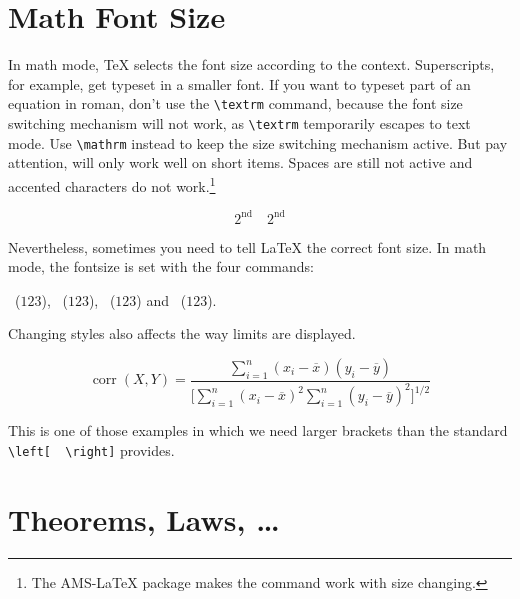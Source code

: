 \section{Math Font Size}

 In math mode, \TeX{} selects the font size
according to the context. Superscripts, for example, get typeset in a
smaller font. If you want to typeset part of an equation in roman,
don't use the \verb|\textrm| command, because the font size switching
mechanism will not work, as \verb|\textrm| temporarily escapes to text
mode. Use \verb|\mathrm| instead to keep the size switching mechanism
active. But pay attention,  will only work well on short
items. Spaces are still not active and accented characters do not
work.\footnote{The AMS-\LaTeX{} package makes the  command
  work with size changing.}

\begin{example}
\begin{equation}
2^{\textrm{nd}} \quad 
2^{\mathrm{nd}}
\end{equation}
\end{example}

Nevertheless, sometimes you need to tell \LaTeX{} the correct font
size. In math mode, the fontsize is set with the four commands:
\begin{flushleft}
~($\displaystyle 123$),
 ~($\textstyle 123$), 
~($\scriptstyle 123$) and
~($\scriptscriptstyle 123$).
\end{flushleft}

Changing styles also affects the way limits are displayed.

\begin{example}
\begin{displaymath}
\mathop{\mathrm{corr}}(X,Y)= 
 \frac{\displaystyle 
   \sum_{i=1}^n(x_i-\overline x)
   (y_i-\overline y)} 
  {\displaystyle\biggl[
 \sum_{i=1}^n(x_i-\overline x)^2
\sum_{i=1}^n(y_i-\overline y)^2
\biggr]^{1/2}}
\end{displaymath}    
\end{example}

\noindent This is one of those examples in which we need larger
brackets than the standard \verb|\left[  \right]| provides.


\section{Theorems, Laws, \ldots}

